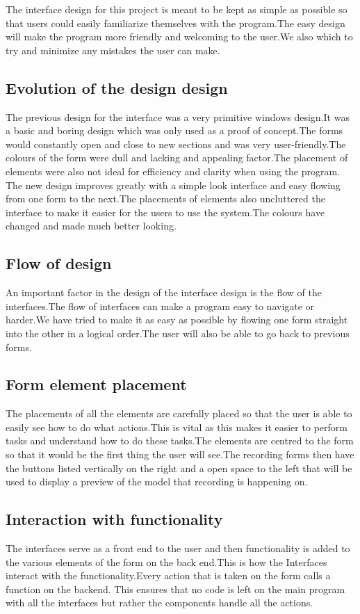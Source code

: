 The interface design for this project is meant to be kept as simple as possible so that users could easily familiarize themselves with the program.The easy design will make the program more friendly and welcoming to the user.We also which to try and minimize any mistakes the user can make.

\subsection{Evolution of the design design}
The previous design for the interface was a very primitive windows design.It was a basic and boring design which was only used as a proof of concept.The forms would constantly open and close to new sections and was very user-friendly.The colours of the form were dull and lacking and appealing factor.The placement of elements were also not ideal for efficiency and clarity when using the program.\\

The new design improves greatly with a simple look interface and easy flowing from one form to the next.The placements of elements also uncluttered the interface to make it easier for the users to use the system.The colours have changed and made much better looking.
\subsection{Flow of design}
An important factor in the design of the interface design is the flow of the interfaces.The flow of interfaces can make a program easy to navigate or harder.We have tried to make it as easy as possible by flowing one form straight into the other in a logical order.The user will also be able to go back to previous forms.
\subsection{Form element placement}
The placements of all the elements are carefully placed so that the user is able to easily see how to do what actions.This is vital as this makes it easier to perform tasks and understand how to do these tasks.The elements are centred to the form so that it would be the first thing the user will see.The recording forms then have the buttons listed vertically on the right and a open space to the left that will be used to display a preview of the model that recording is happening on.

\subsection{Interaction with functionality}
The interfaces serve as a front end to the user and then functionality is added to the various elements of the form on the back end.This is how the Interfaces interact with the functionality.Every action that is taken on the form calls a function on the backend. This ensures that no code is left on the main program with all the interfaces but rather the components handle all the actions.